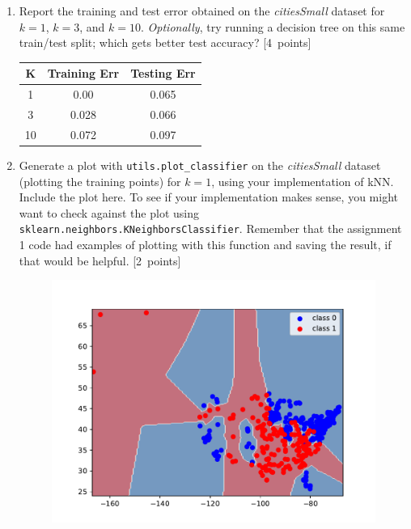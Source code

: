 \documentclass{article}
\newcommand{\blu}[1]{{\textcolor{blu}{#1}}}
\let\ask\blu
\newcommand\pts[1]{\textcolor{pointscolour}{[#1~points]}}
\begin{document}
\begin{enumerate}
        \item \ask{Report the training and test error} obtained on the \emph{citiesSmall} dataset for $k=1$, $k=3$, and $k=10$. \emph{Optionally}, try running a decision tree on this same train/test split; which gets better test accuracy? \pts{4}
        \begin{table}[!htbp]
            \centering
            \begin{tabular}{ccc}
                \hline
                K & Training Err & Testing Err\\
                \hline
                1 & 0.00 & 0.065\\
                3 & 0.028 & 0.066\\
                10 & 0.072 & 0.097\\
                \hline
            \end{tabular}
        \end{table}
        \item Generate a plot with \texttt{utils.plot\_classifier} on the \emph{citiesSmall} dataset (plotting the training points) for $k=1$, using your implementation of kNN. \ask{Include the plot here.} To see if your implementation makes sense, you might want to check against the plot using \texttt{sklearn.neighbors.KNeighborsClassifier}. Remember that the assignment 1 code had examples of plotting with this function and saving the result, if that would be helpful. \pts{2}
        \begin{figure}[!htbp]
            \centering
            \includegraphics[width = 0.9 \textwidth]{figs/knnDecisionBoundary.pdf}
        \end{figure}


\end{enumerate}
\end{document}

